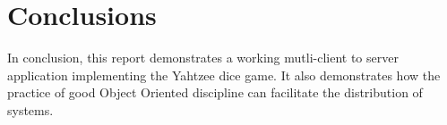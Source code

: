 \section{Conclusions}

In conclusion, this report demonstrates a working mutli-client to server application implementing the Yahtzee dice game. It also demonstrates how the practice of good Object Oriented discipline can facilitate the distribution of systems.